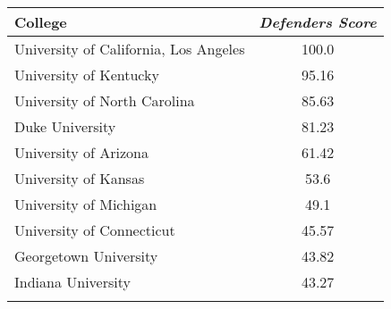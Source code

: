 \documentclass[10pt,a4paper,twocolumn]{article}
\begin{document}
\begin{table*}[t]
\begin{tabular}{lc}
	\end{tabular}
	
	\begin{tabular}{lc}
		College & \textit{Defenders Score}  \\
		\hline
		University of California, Los Angeles & 100.0\\
		University of Kentucky & 95.16\\
		University of North Carolina & 85.63\\
		Duke University & 81.23\\
		University of Arizona & 61.42\\
		University of Kansas & 53.6\\
		University of Michigan & 49.1\\
		University of Connecticut & 45.57\\
		Georgetown University & 43.82\\
		Indiana University & 43.27\\
		&\\
		
	\end{tabular}
	
\end{table*}
\end{document}
